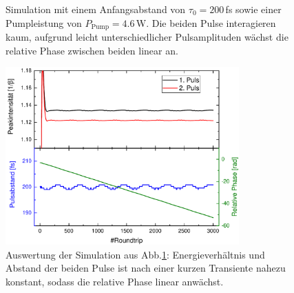 \documentclass[bachelor,       %
               twoside,        %
               BCOR10mm,       %
               liststotoc,nomtotoc,bibtotoc, %
               english,ngerman, %
               final,          %
               ]{GAUBM}
\begin{document}
\begin{figure}[!htb]
   \centering
   \hfill
   \caption{Simulation mit einem Anfangsabstand von $\tau_0=200\,$fs sowie einer Pumpleistung von $P_\text{Pump}=4.6\,$W. Die beiden Pulse  interagieren kaum, aufgrund leicht unterschiedlicher Pulsamplituden wächst die relative Phase zwischen beiden linear an.}
   \label{fig:SimulationLinearPhase}
\end{figure}

\begin{figure}[!htb]
	\centering
	\includegraphics[width=0.8\textwidth]{figures/SimRBLinear}
	\caption{Auswertung der Simulation aus Abb.\ref{fig:SimulationLinearPhase}: Energieverhältnis und Abstand der beiden Pulse ist nach einer kurzen Transiente nahezu konstant, sodass die relative Phase linear anwächst.}
	\label{fig:SimRBLinear}
\end{figure}
\end{document}
